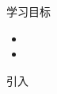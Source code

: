 \documentclass{beamer}
\begin{document}
\kaishu
\mytitle{}
\begin{frame}{学习目标}
  \begin{itemize}[<+->]
    \item 
    \item 
  \end{itemize}
\end{frame}


\begin{frame}{引入}

\end{frame}


\begin{frame}{}

\end{frame}

\begin{frame}{}

\end{frame}

\begin{frame}{}

\end{frame}

\begin{frame}{}

\end{frame}

\begin{frame}{}

\end{frame}

\begin{frame}{}

\end{frame}
\end{document}
